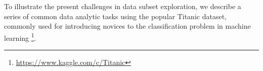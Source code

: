

\par To illustrate the present challenges in data subset exploration, we describe a series of common data analytic tasks using the popular Titanic dataset, commonly used for introducing novices to the classification problem in machine learning \footnote{\url{https://www.kaggle.com/c/Titanic}}.

